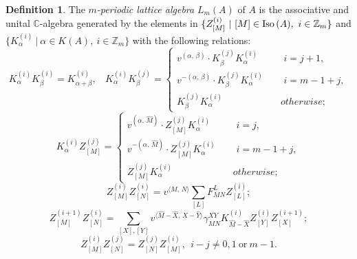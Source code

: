 \documentclass[reqno,12pt]{amsart}
\numberwithin{equation}{section}
\theoremstyle{plain}
\theoremstyle{definition}
\newtheorem{definition}[theorem]{\bf Definition}
\begin{document}
\begin{definition}\label{m-periodic}
The \emph{$m$-periodic lattice algebra} $L_m(A)$ of $A$ is the associative and unital $\mathbb{C}$-algebra generated by the elements in $\{Z_{[M]}^{(i)}~|~[M]\in{\mbox{\rm Iso}\,}( A),~i\in \mathbb{Z}_m\}$ and $\{K_\alpha^{(i)}~|~\alpha\in K(A),~i\in \mathbb{Z}_m\}$ with the following relations:
\begin{equation}\label{x1}
{K_\alpha^{(i)}} {K_\beta^{(i)}}={K_{\alpha+\beta}^{(i)}},~~~~
{K_\alpha^{(i)}} {K_\beta^{(j)}}=\begin{cases}
v^{( \alpha,\,\beta)}\cdot{K_\beta^{(j)}} {K_\alpha^{(i)}} \quad &\text{~$i=j+1$},\\
v^{-( \alpha,\,\beta)}\cdot{K_\beta^{(j)}} {K_\alpha^{(i)}} \quad &\text{~$i=m-1+j$},\\
{K_\beta^{(j)}} {K_\alpha^{(i)}} & {otherwise;}
\end{cases}\end{equation}
\begin{equation}\label{x2}
{K_\alpha^{(i)}}Z_{[M]}^{(j)}=\begin{cases}
v^{(\alpha,\,\hat{M})}\cdot Z_{[M]}^{(j)}K_\alpha^{(i)} \quad &\text{~$i=j$},\\
v^{-(\alpha,\,\hat{M})}\cdot Z_{[M]}^{(j)}K_\alpha^{(i)} \quad &\text{~$i=m-1+j$},\\
Z_{[M]}^{(j)}K_\alpha^{(i)} & {otherwise;}
\end{cases}\end{equation}
\begin{equation}\label{x3}
Z_{[M]}^{(i)}Z_{[N]}^{(i)}=v^{{\langle {M,\,N}\rangle}}\sum\limits_{[L]}F_{MN}^LZ_{[L]}^{(i)};
\end{equation}
\begin{equation}\label{x4}
Z_{[M]}^{(i+1)}Z_{[N]}^{(i)}=\sum\limits_{[X],[Y]}v^{{\langle {\hat{M}-\hat{X},\,\hat{X}-\hat{Y}}\rangle}}\gamma_{MN}^{XY}K_{\hat{M}-\hat{X}}^{(i)}Z_{[Y]}^{(i)}Z_{[X]}^{(i+1)};
\end{equation}
\begin{equation}\label{x5}
Z_{[M]}^{(i)}Z_{[N]}^{(j)}=Z_{[N]}^{(j)}Z_{[M]}^{(i)},~~i-j\neq0, 1~\mbox{or}~m-1.
\end{equation}
\end{definition}
\end{document}

